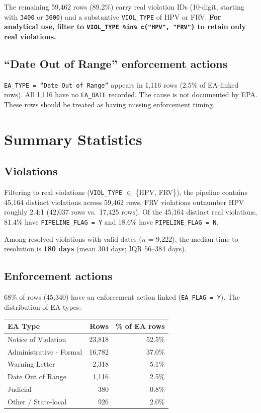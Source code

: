 \documentclass[11pt]{article}
\begin{document}
\noindent The remaining 59,462 rows (89.2\%) carry real violation IDs (10-digit, starting with \texttt{3400} or \texttt{3600}) and a substantive \texttt{VIOL\_TYPE} of HPV or FRV. \textbf{For analytical use, filter to \texttt{VIOL\_TYPE \%in\% c("HPV", "FRV")} to retain only real violations.}

\subsection*{``Date Out of Range'' enforcement actions}

\texttt{EA\_TYPE = ``Date Out of Range''} appears in 1,116 rows (2.5\% of EA-linked rows). All 1,116 have no \texttt{EA\_DATE} recorded. The cause is not documented by EPA. These rows should be treated as having missing enforcement timing.

\section{Summary Statistics}

\subsection*{Violations}

Filtering to real violations (\texttt{VIOL\_TYPE} $\in$ \{HPV, FRV\}), the pipeline contains 45,164 distinct violations across 59,462 rows. FRV violations outnumber HPV roughly 2.4:1 (42,037 rows vs.\ 17,425 rows). Of the 45,164 distinct real violations, 81.4\% have \texttt{PIPELINE\_FLAG = Y} and 18.6\% have \texttt{PIPELINE\_FLAG = N}.

Among resolved violations with valid dates ($n$ = 9,222), the median time to resolution is \textbf{180 days} (mean 304 days; IQR 56--384 days).

\subsection*{Enforcement actions}

68\% of rows (45,340) have an enforcement action linked (\texttt{EA\_FLAG = Y}). The distribution of EA types:

\begin{table}[H]
\centering
\begin{tabular}{lrr}
\toprule
EA Type & Rows & \% of EA rows \\
\midrule
Notice of Violation & 23,818 & 52.5\% \\
Administrative - Formal & 16,782 & 37.0\% \\
Warning Letter & 2,318 & 5.1\% \\
Date Out of Range & 1,116 & 2.5\% \\
Judicial & 380 & 0.8\% \\
Other / State-local & 926 & 2.0\% \\
\bottomrule
\end{tabular}
\end{table}
\end{document}
